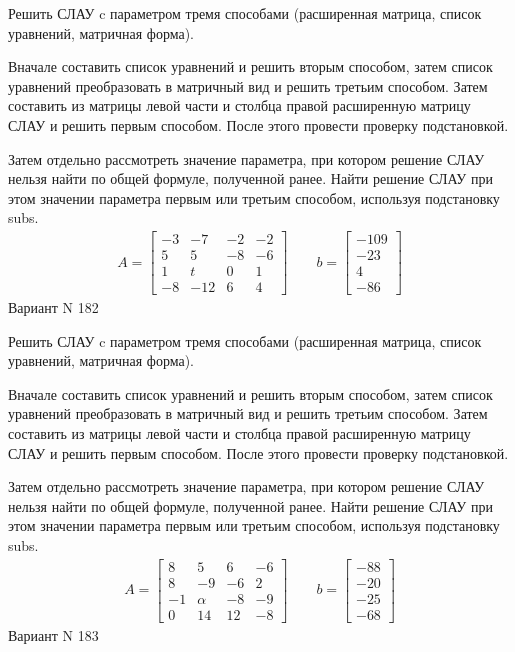 \documentclass[11pt]{report}
\begin{document}
Решить СЛАУ c параметром тремя способами (расширенная матрица, список уравнений, матричная форма).

Вначале составить список уравнений и решить вторым способом,
затем список уравнений преобразовать в матричный вид и решить третьим способом.
Затем составить из матрицы левой части и столбца правой расширенную матрицу СЛАУ и решить первым способом.
После этого провести проверку подстановкой.

Затем отдельно рассмотреть значение параметра, при котором решение СЛАУ нельзя найти по общей формуле,
полученной ранее.
Найти решение СЛАУ при этом значении параметра первым или третьим способом, используя подстановку subs.
\begin{align*}
    A = \left[\begin{matrix}-3 & -7 & -2 & -2\\5 & 5 & -8 & -6\\1 & t & 0 & 1\\-8 & -12 & 6 & 4\end{matrix}\right]
\qquad b = \left[\begin{matrix}-109\\-23\\4\\-86\end{matrix}\right]
\end{align*}
\newpage
Вариант N 182


Решить СЛАУ c параметром тремя способами (расширенная матрица, список уравнений, матричная форма).

Вначале составить список уравнений и решить вторым способом,
затем список уравнений преобразовать в матричный вид и решить третьим способом.
Затем составить из матрицы левой части и столбца правой расширенную матрицу СЛАУ и решить первым способом.
После этого провести проверку подстановкой.

Затем отдельно рассмотреть значение параметра, при котором решение СЛАУ нельзя найти по общей формуле,
полученной ранее.
Найти решение СЛАУ при этом значении параметра первым или третьим способом, используя подстановку subs.
\begin{align*}
    A = \left[\begin{matrix}8 & 5 & 6 & -6\\8 & -9 & -6 & 2\\-1 & \alpha & -8 & -9\\0 & 14 & 12 & -8\end{matrix}\right]
\qquad b = \left[\begin{matrix}-88\\-20\\-25\\-68\end{matrix}\right]
\end{align*}
\newpage
Вариант N 183
\end{document}
